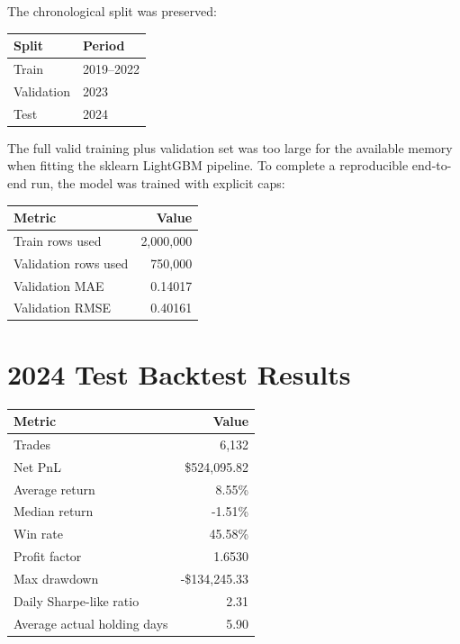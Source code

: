\documentclass[11pt]{article}
\begin{document}
The chronological split was preserved:

\begin{center}
\begin{tabular}{@{}ll@{}}
\toprule
Split & Period \\
\midrule
Train & 2019--2022 \\
Validation & 2023 \\
Test & 2024 \\
\bottomrule
\end{tabular}
\end{center}

The full valid training plus validation set was too large for the available memory when fitting the sklearn LightGBM pipeline. To complete a reproducible end-to-end run, the model was trained with explicit caps:

\begin{center}
\begin{tabular}{@{}lr@{}}
\toprule
Metric & Value \\
\midrule
Train rows used & 2,000,000 \\
Validation rows used & 750,000 \\
Validation MAE & 0.14017 \\
Validation RMSE & 0.40161 \\
\bottomrule
\end{tabular}
\end{center}

\section{2024 Test Backtest Results}

\begin{center}
\begin{tabular}{@{}lr@{}}
\toprule
Metric & Value \\
\midrule
Trades & 6,132 \\
Net PnL & \$524,095.82 \\
Average return & 8.55\% \\
Median return & -1.51\% \\
Win rate & 45.58\% \\
Profit factor & 1.6530 \\
Max drawdown & -\$134,245.33 \\
Daily Sharpe-like ratio & 2.31 \\
Average actual holding days & 5.90 \\
\bottomrule
\end{tabular}
\end{center}
\end{document}

